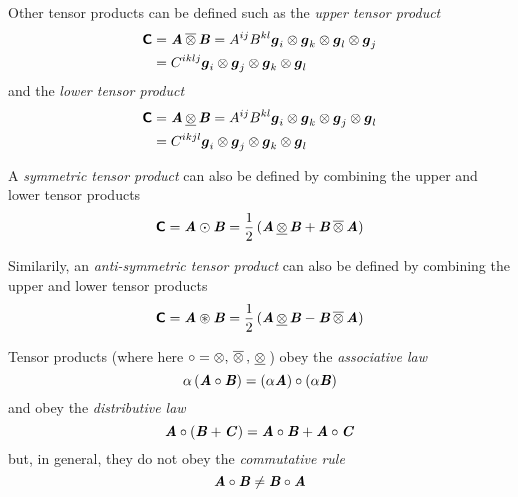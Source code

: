 Other tensor products can be defined
\cite{del_piero_properties_1979,curnier_conewise_1994,itskov_theory_2000,kintzel_fourth-order_2006}
such as the \emph{upper tensor product} \ie
\begin{equation}
  \begin{aligned}
    \boldsymbol{\mathsf{C}}&= \boldsymbol{\mathit{A}} \, \overline{\otimes} \, \boldsymbol{\mathit{B}} =A^{ij}B^{kl}  \boldsymbol{g} _{i} \otimes  \boldsymbol{g} _{k} \otimes  \boldsymbol{g} _{l} \otimes  \boldsymbol{g} _{j} \\
    &=C^{iklj}  \boldsymbol{g} _{i} \otimes  \boldsymbol{g} _{j} \otimes  \boldsymbol{g} _{k} \otimes  \boldsymbol{g} _{l} 
  \end{aligned}
\end{equation}
and the \emph{lower tensor product} \ie
\begin{equation}
  \begin{aligned}
    \boldsymbol{\mathsf{C}}&= \boldsymbol{\mathit{A}} \, \underline{\otimes} \, \boldsymbol{\mathit{B}} =A^{ij}B^{kl}  \boldsymbol{g} _{i} \otimes  \boldsymbol{g} _{k} \otimes  \boldsymbol{g} _{j} \otimes  \boldsymbol{g} _{l} \\
    &=C^{ikjl}  \boldsymbol{g} _{i} \otimes  \boldsymbol{g} _{j} \otimes  \boldsymbol{g} _{k} \otimes  \boldsymbol{g} _{l} 
  \end{aligned}
\end{equation}

A \emph{symmetric tensor product} can also be defined by combining the upper
and lower tensor products \ie
\begin{equation}
   \boldsymbol{\mathsf{C}}= \boldsymbol{\mathit{A}} \odot \boldsymbol{\mathit{B}} =\dfrac{1}{2}\left(  \boldsymbol{\mathit{A}} \, \underline{\otimes} \, \boldsymbol{\mathit{B}} 
      + \boldsymbol{\mathit{B}} \, \overline{\otimes} \, \boldsymbol{\mathit{A}}  \right)
\end{equation}

Similarily, an \emph{anti-symmetric tensor product} can also be defined by combining the upper
and lower tensor products \ie
\begin{equation}
   \boldsymbol{\mathsf{C}}= \boldsymbol{\mathit{A}} \circledast \boldsymbol{\mathit{B}} =\dfrac{1}{2}\left(  \boldsymbol{\mathit{A}} \, \underline{\otimes} \, \boldsymbol{\mathit{B}} 
      - \boldsymbol{\mathit{B}} \, \overline{\otimes} \, \boldsymbol{\mathit{A}}  \right)
\end{equation}

Tensor products (where here $\circ =  \otimes ,
 \, \overline{\otimes} \, ,  \, \underline{\otimes} \, $) obey the \emph{associative law}
\begin{equation}
  \alpha\left( \boldsymbol{\mathit{A}}\circ\boldsymbol{\mathit{B}} \right)=\left( \alpha\boldsymbol{\mathit{A}} \right)\circ\left( \alpha\boldsymbol{\mathit{B}} \right)
\end{equation}
and obey the \emph{distributive law}
\begin{equation}
  \boldsymbol{\mathit{A}}\circ\left( \boldsymbol{\mathit{B}}+\boldsymbol{\mathit{C}} \right)=\boldsymbol{\mathit{A}}\circ\boldsymbol{\mathit{B}}+\boldsymbol{\mathit{A}}\circ\boldsymbol{\mathit{C}}
\end{equation}
but, in general, they do not obey the \emph{commutative rule}
\begin{equation}
  \boldsymbol{\mathit{A}}\circ\boldsymbol{\mathit{B}}\neq\boldsymbol{\mathit{B}}\circ\boldsymbol{\mathit{A}}
\end{equation}

